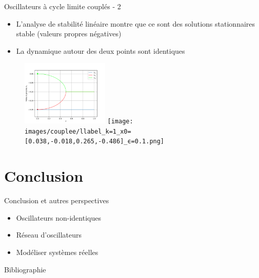 \begin{frame}{Oscillateurs à cycle limite couplés - 2}
  \begin{itemize}
    \item L'analyse de stabilité linéaire montre que ce sont des solutions stationnaires stable (valeurs propres négatives)
      \item La dynamique autour des deux points sont identiques
  \end{itemize}
  \begin{figure}
    \centering
    \includegraphics[width=0.37\textwidth]{images/couplee/eigenvalues_eps=0.2.png}
    \hfill
    \texttt{[image: images/couplee/llabel\_k=1\_x0=[0.038,-0.018,0.265,-0.486]\_ϵ=0.1.png]}
\end{figure}
\end{frame}


\section{Conclusion}
\begin{frame}{Conclusion et autres perspectives}
  \begin{itemize}
    \item Oscillateurs non-identiques
    \item Réseau d'oscillateurs
    \item Modéliser systèmes réelles
  \end{itemize}
\end{frame}

\begin{frame}{Bibliographie}
    \TINY
    \printbibliography
\end{frame}



